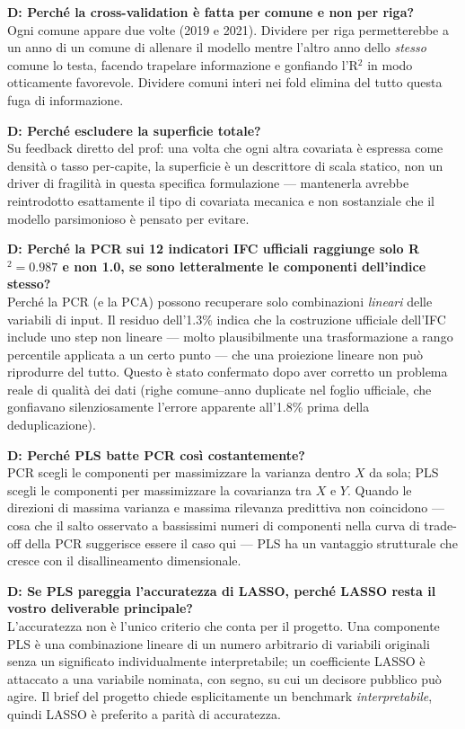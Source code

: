 \documentclass[11pt,a4paper]{article}
\begin{document}
\textbf{D: Perché la cross-validation è fatta per comune e non per
riga?}\\
Ogni comune appare due volte (2019 e 2021). Dividere per riga
permetterebbe a un anno di un comune di allenare il modello mentre
l'altro anno dello \emph{stesso} comune lo testa, facendo trapelare
informazione e gonfiando l'R$^2$ in modo otticamente favorevole.
Dividere comuni interi nei fold elimina del tutto questa fuga di
informazione.

\textbf{D: Perché escludere la superficie totale?}\\
Su feedback diretto del prof: una volta che ogni altra covariata è
espressa come densità o tasso per-capite, la superficie è un
descrittore di scala statico, non un driver di fragilità in questa
specifica formulazione --- mantenerla avrebbe reintrodotto esattamente
il tipo di covariata mecanica e non sostanziale che il modello
parsimonioso è pensato per evitare.

\textbf{D: Perché la PCR sui 12 indicatori IFC ufficiali raggiunge
solo R$^2=0.987$ e non 1.0, se sono letteralmente le componenti
dell'indice stesso?}\\
Perché la PCR (e la PCA) possono recuperare solo combinazioni
\emph{lineari} delle variabili di input. Il residuo dell'1.3\%
indica che la costruzione ufficiale dell'IFC include uno step non
lineare --- molto plausibilmente una trasformazione a rango
percentile applicata a un certo punto --- che una proiezione lineare
non può riprodurre del tutto. Questo è stato confermato dopo aver
corretto un problema reale di qualità dei dati (righe
comune--anno duplicate nel foglio ufficiale, che gonfiavano
silenziosamente l'errore apparente all'1.8\% prima della
deduplicazione).

\textbf{D: Perché PLS batte PCR così costantemente?}\\
PCR scegli le componenti per massimizzare la varianza dentro $X$ da
sola; PLS scegli le componenti per massimizzare la covarianza tra
$X$ e $Y$. Quando le direzioni di massima varianza e massima
rilevanza predittiva non coincidono --- cosa che il salto osservato a
bassissimi numeri di componenti nella curva di trade-off della PCR
suggerisce essere il caso qui --- PLS ha un vantaggio strutturale che
cresce con il disallineamento dimensionale.

\textbf{D: Se PLS pareggia l'accuratezza di LASSO, perché LASSO
resta il vostro deliverable principale?}\\
L'accuratezza non è l'unico criterio che conta per il progetto. Una
componente PLS è una combinazione lineare di un numero arbitrario di
variabili originali senza un significato individualmente
interpretabile; un coefficiente LASSO è attaccato a una variabile
nominata, con segno, su cui un decisore pubblico può agire. Il
brief del progetto chiede esplicitamente un benchmark
\emph{interpretabile}, quindi LASSO è preferito a parità di
accuratezza.
\end{document}
